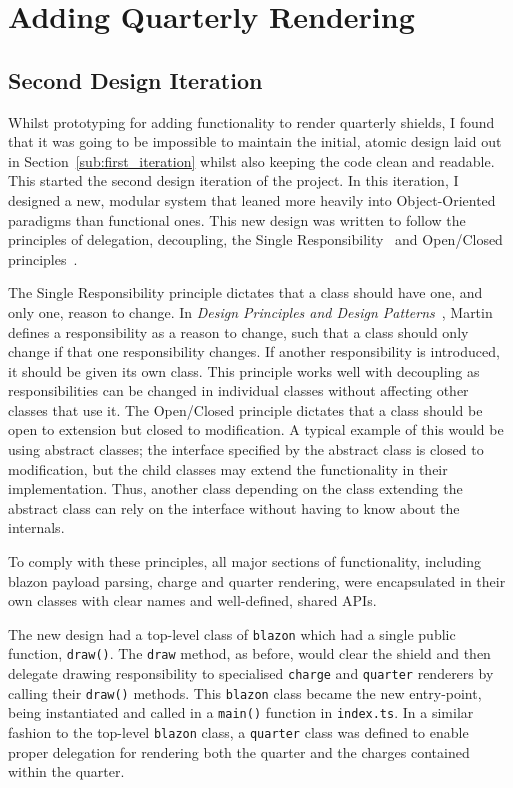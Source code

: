 \documentclass[nobib, a4paper, twoside, justified]{tufte-book}
\makeatletter
\newcommand{\charge}{\gls{charge}\@\xspace}
\newcommand{\charges}{\glspl{charge}\@\xspace}
\newcommand{\quarter}{\gls{quarter}\@\xspace}
\newcommand{\blazon}{\gls{blazon}\@\xspace}
\newcommand{\ublazon}{\Gls{blazon}\@\xspace}
\makeatother
\begin{document}
\section{Adding Quarterly Rendering}%
\label{sec:adding_quarterly_rendering}

\subsection{Second Design Iteration}%
\label{sub:second_design_iteration}

Whilst prototyping for adding functionality to render quarterly shields, I found that it was going
to be impossible to maintain the initial, atomic design laid out in
Section~\ref{sub:first_iteration} whilst also keeping the code clean and readable. This started the
second design iteration of the project. In this iteration, I designed a new, modular system that
leaned more heavily into Object-Oriented paradigms than functional ones. This new design was
written to follow the principles of delegation, decoupling, the Single
Responsibility~\autocite{martin2000design} and Open/Closed principles~\autocite{martin2000design}.

The Single Responsibility principle dictates that a class should have one, and only one, reason to
change. In \textit{Design Principles and Design Patterns}~\autocite{martin2000design}, Martin
defines a responsibility as a reason to change, such that a class should only change if that one
responsibility changes. If another responsibility is introduced, it should be given its own class.
This principle works well with decoupling as responsibilities can be changed in individual classes
without affecting other classes that use it. The Open/Closed principle dictates that a class should
be open to extension but closed to modification. A typical example of this would be using abstract
classes; the interface specified by the abstract class is closed to modification, but the child
classes may extend the functionality in their implementation. Thus, another class depending on the
class extending the abstract class can rely on the interface without having to know about the
internals.

To comply with these principles, all major sections of functionality, including \blazon
payload parsing, \charge and \quarter rendering, were encapsulated in their own classes with clear
names and well-defined, shared APIs.

The new design had a top-level class of \texttt{\ublazon} which had a single public function,
\texttt{draw()}. The \texttt{draw} method, as before, would clear the shield and then delegate
drawing responsibility to specialised \texttt{\charge{}} and \texttt{\quarter{}} renderers by
calling their \texttt{draw()} methods. This \texttt{\ublazon} class became the new entry-point, being
instantiated and called in a \texttt{main()} function in \texttt{index.ts}. In a similar fashion to
the top-level \texttt{\ublazon} class, a \texttt{\Gls{quarter}} class was defined to enable proper
delegation for rendering both the \quarter and the \charges contained within the quarter.
\end{document}
